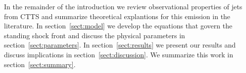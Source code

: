 In the remainder of the introduction we review observational properties of jets from CTTS and summarize theoretical explantions for this emission in the literature. In section~\ref{sect:model} we develop the equations that govern the standing shock front and discuss the physical parameters in section~\ref{sect:parameters}. In section~\ref{sect:results} we present our results and discuss implications in section~\ref{sect:discussion}. We summarize this work in section~\ref{sect:summary}.